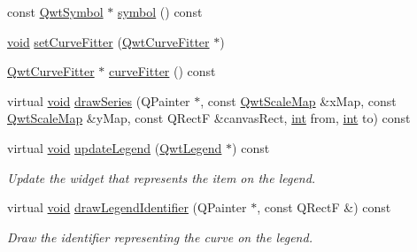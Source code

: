\begin{DoxyCompactItemize}
\item 
const \hyperlink{class_qwt_symbol}{Qwt\-Symbol} $\ast$ \hyperlink{class_qwt_plot_curve_a38e6e66301d602e80bf751f43820c080}{symbol} () const 
\item 
\hyperlink{group___u_a_v_objects_plugin_ga444cf2ff3f0ecbe028adce838d373f5c}{void} \hyperlink{class_qwt_plot_curve_ac15588c78d175906a30de501b4dd7957}{set\-Curve\-Fitter} (\hyperlink{class_qwt_curve_fitter}{Qwt\-Curve\-Fitter} $\ast$)
\item 
\hyperlink{class_qwt_curve_fitter}{Qwt\-Curve\-Fitter} $\ast$ \hyperlink{class_qwt_plot_curve_aaf299522e4ad972996c781aacc940d31}{curve\-Fitter} () const 
\item 
virtual \hyperlink{group___u_a_v_objects_plugin_ga444cf2ff3f0ecbe028adce838d373f5c}{void} \hyperlink{class_qwt_plot_curve_aea90af49da5296087499e06ae1e35c9e}{draw\-Series} (Q\-Painter $\ast$, const \hyperlink{class_qwt_scale_map}{Qwt\-Scale\-Map} \&x\-Map, const \hyperlink{class_qwt_scale_map}{Qwt\-Scale\-Map} \&y\-Map, const Q\-Rect\-F \&canvas\-Rect, \hyperlink{ioapi_8h_a787fa3cf048117ba7123753c1e74fcd6}{int} from, \hyperlink{ioapi_8h_a787fa3cf048117ba7123753c1e74fcd6}{int} to) const 
\item 
virtual \hyperlink{group___u_a_v_objects_plugin_ga444cf2ff3f0ecbe028adce838d373f5c}{void} \hyperlink{class_qwt_plot_curve_aedbca95048e4c7b42cd0bf486ec36b4d}{update\-Legend} (\hyperlink{class_qwt_legend}{Qwt\-Legend} $\ast$) const 
\begin{DoxyCompactList}\small\item\em Update the widget that represents the item on the legend. \end{DoxyCompactList}\item 
virtual \hyperlink{group___u_a_v_objects_plugin_ga444cf2ff3f0ecbe028adce838d373f5c}{void} \hyperlink{class_qwt_plot_curve_a8e9518a3e9f64e1d024a7f4550335df0}{draw\-Legend\-Identifier} (Q\-Painter $\ast$, const Q\-Rect\-F \&) const 
\begin{DoxyCompactList}\small\item\em Draw the identifier representing the curve on the legend. \end{DoxyCompactList}\end{DoxyCompactItemize}
